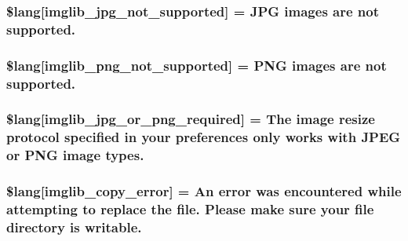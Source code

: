 \subsubsection[{\$lang}]{\setlength{\rightskip}{0pt plus 5cm}\$lang\mbox{[}\textquotesingle{}imglib\+\_\+jpg\+\_\+not\+\_\+supported\textquotesingle{}\mbox{]} = \textquotesingle{}J\+P\+G images are not supported.\textquotesingle{}}\label{system_2language_2english_2imglib__lang_8php_a4acdc927c172bab1370b2897c667c552}
\hypertarget{system_2language_2english_2imglib__lang_8php_a0b7ea2e2fbd03eb72fe9d969adb643dd}{}
\subsubsection[{\$lang}]{\setlength{\rightskip}{0pt plus 5cm}\$lang\mbox{[}\textquotesingle{}imglib\+\_\+png\+\_\+not\+\_\+supported\textquotesingle{}\mbox{]} = \textquotesingle{}P\+N\+G images are not supported.\textquotesingle{}}\label{system_2language_2english_2imglib__lang_8php_a0b7ea2e2fbd03eb72fe9d969adb643dd}
\hypertarget{system_2language_2english_2imglib__lang_8php_a2878e2b878871cd8010970f865d70e71}{}
\subsubsection[{\$lang}]{\setlength{\rightskip}{0pt plus 5cm}\$lang\mbox{[}\textquotesingle{}imglib\+\_\+jpg\+\_\+or\+\_\+png\+\_\+required\textquotesingle{}\mbox{]} = \textquotesingle{}The image resize protocol specified in your preferences only works with J\+P\+E\+G or P\+N\+G image types.\textquotesingle{}}\label{system_2language_2english_2imglib__lang_8php_a2878e2b878871cd8010970f865d70e71}
\hypertarget{system_2language_2english_2imglib__lang_8php_a012b6a0d2b3a8ef934e8783d2fbd6535}{}
\subsubsection[{\$lang}]{\setlength{\rightskip}{0pt plus 5cm}\$lang\mbox{[}\textquotesingle{}imglib\+\_\+copy\+\_\+error\textquotesingle{}\mbox{]} = \textquotesingle{}An error was encountered while attempting to replace the file. Please make sure your file directory is writable.\textquotesingle{}}\label{system_2language_2english_2imglib__lang_8php_a012b6a0d2b3a8ef934e8783d2fbd6535}
\hypertarget{system_2language_2english_2imglib__lang_8php_ab1c77c6b58fc5bf8e979ab4237ec87e7}{}
